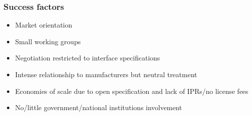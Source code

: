 \begin{frame}
  \frametitle{Success factors}
  
  \begin{itemize}
   \item Market orientation 
   \item Small working groups
   \item Negotiation restricted to interface specifications
   \item Intense relationship to manufacturers but neutral treatment
   \item Economies of scale due to open specification and lack of IPRs/no license fees 
   \item No/little government/national institutions involvement
  \end{itemize}
\end{frame}
